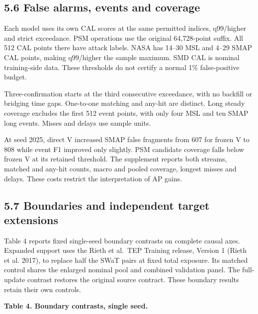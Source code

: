 \documentclass[
  english,
  10pt,
]{article}
\begin{document}
\subsection{5.6 False alarms, events and
coverage}\label{false-alarms-events-and-coverage}

Each model uses its own CAL scores at the same permitted indices,
q99/higher and strict exceedance. PSM operations use the original
64,728-point suffix. All 512 CAL points there have attack labels. NASA
has 14--30 MSL and 4--29 SMAP CAL points, making q99/higher the sample
maximum. SMD CAL is nominal training-side data. These thresholds do not
certify a normal 1\% false-positive budget.

Three-confirmation starts at the third consecutive exceedance, with no
backfill or bridging time gaps. One-to-one matching and any-hit are
distinct. Long steady coverage excludes the first 512 event points, with
only four MSL and ten SMAP long events. Misses and delays use sample
units.

At seed 2025, direct V increased SMAP false fragments from 607 for
frozen V to 808 while event F1 improved only slightly. PSM candidate
coverage falls below frozen V at its retained threshold. The supplement
reports both streams, matched and any-hit counts, macro and pooled
coverage, longest misses and delays. These costs restrict the
interpretation of AP gains.

\subsection{5.7 Boundaries and independent target
extensions}\label{boundaries-and-independent-target-extensions}

Table 4 reports fixed single-seed boundary contrasts on complete causal
axes. Expanded support uses the Rieth et al.~TEP Training release,
Version 1 (Rieth et al. 2017), to replace half the SWaT pairs at fixed
total exposure. Its matched control shares the enlarged nominal pool and
combined validation panel. The full-update contrast restores the
original source contract. These boundary results retain their own
controls.

\textbf{Table 4. Boundary contrasts, single seed.}
\end{document}
